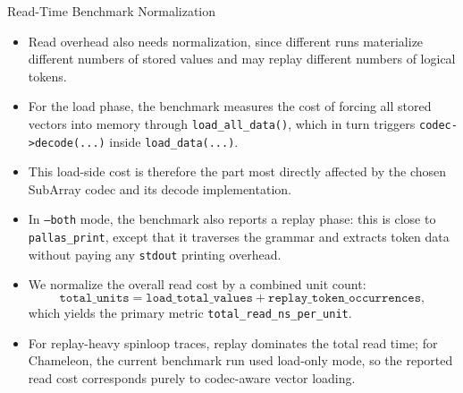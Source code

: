 \documentclass[10pt,aspectratio=169]{beamer}
\begin{document}
\begin{frame}{Read-Time Benchmark Normalization}
  \small
  \begin{itemize}
    \item<1-> Read overhead also needs normalization, since different runs materialize different numbers of stored values and may replay different numbers of logical tokens.
    \item<2-> For the load phase, the benchmark measures the cost of forcing all stored vectors into memory through \texttt{load\_all\_data()}, which in turn triggers \texttt{codec->decode(...)} inside \texttt{load\_data(...)}.
    \item<3-> This load-side cost is therefore the part most directly affected by the chosen SubArray codec and its decode implementation.
    \item<4-> In \texttt{--both} mode, the benchmark also reports a replay phase: this is close to \texttt{pallas\_print}, except that it traverses the grammar and extracts token data without paying any \texttt{stdout} printing overhead.
    \item<5-> We normalize the overall read cost by a combined unit count:
    \[
      \texttt{total\_units} = \texttt{load\_total\_values} + \texttt{replay\_token\_occurrences},
    \]
    which yields the primary metric \texttt{total\_read\_ns\_per\_unit}.
    \item<6-> For replay-heavy spinloop traces, replay dominates the total read time; for Chameleon, the current benchmark run used load-only mode, so the reported read cost corresponds purely to codec-aware vector loading.
  \end{itemize}
\end{frame}
\end{document}
